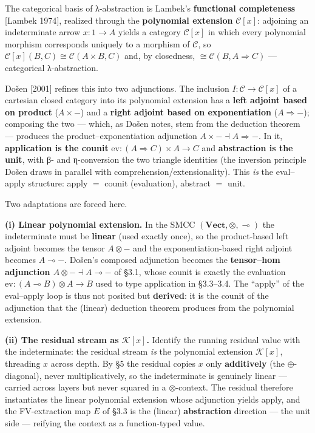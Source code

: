\documentclass[a4paper,11pt]{article}
\begin{document}
The categorical basis of λ-abstraction is Lambek's \textbf{functional
completeness} {[}Lambek 1974{]}, realized through the \textbf{polynomial
extension} \(\mathcal{C}[x]\): adjoining an indeterminate arrow
\(x:1\to A\) yields a category \(\mathcal{C}[x]\) in which every
polynomial morphism corresponds uniquely to a morphism of
\(\mathcal{C}\), so \(\mathcal{C}[x](B,C)\cong\mathcal{C}(A\times B,C)\)
and, by closedness, \(\cong\mathcal{C}(B,A\Rightarrow C)\) ---
categorical λ-abstraction.

Došen {[}2001{]} refines this into two adjunctions. The inclusion
\(I:\mathcal{C}\to\mathcal{C}[x]\) of a cartesian closed category into
its polynomial extension has a \textbf{left adjoint based on product}
(\(A\times-\)) and a \textbf{right adjoint based on exponentiation}
(\(A\Rightarrow-\)); composing the two --- which, as Došen notes, stem
from the deduction theorem --- produces the product--exponentiation
adjunction \(A\times-\dashv A\Rightarrow-\). In it, \textbf{application
is the counit} \(\mathrm{ev}:(A\Rightarrow C)\times A\to C\) and
\textbf{abstraction is the unit}, with β- and η-conversion the two
triangle identities (the inversion principle Došen draws in parallel
with comprehension/extensionality). This \emph{is} the eval--apply
structure: apply \(=\) counit (evaluation), abstract \(=\) unit.

Two adaptations are forced here.

\textbf{(i) Linear polynomial extension.} In the SMCC
\((\mathbf{Vect},\otimes,\multimap)\) the indeterminate must be
\textbf{linear} (used exactly once), so the product-based left adjoint
becomes the tensor \(A\otimes-\) and the exponentiation-based right
adjoint becomes \(A\multimap-\). Došen's composed adjunction becomes the
\textbf{tensor--hom adjunction \(A\otimes-\dashv A\multimap-\)} of §3.1,
whose counit is exactly the evaluation
\(\mathrm{ev}:(A\multimap B)\otimes A\to B\) used to type application in
§3.3--3.4. The ``apply'' of the eval--apply loop is thus not posited but
\textbf{derived}: it is the counit of the adjunction that the (linear)
deduction theorem produces from the polynomial extension.

\textbf{(ii) The residual stream as \(\mathcal{K}[x]\).} Identify the
running residual value with the indeterminate: the residual stream
\emph{is} the polynomial extension \(\mathcal{K}[x]\), threading \(x\)
across depth. By §5 the residual copies \(x\) only \textbf{additively}
(the \(\oplus\)-diagonal), never multiplicatively, so the indeterminate
is genuinely linear --- carried across layers but never squared in a
\(\otimes\)-context. The residual therefore instantiates the linear
polynomial extension whose adjunction yields apply, and the
FV-extraction map \(E\) of §3.3 is the (linear) \textbf{abstraction}
direction --- the unit side --- reifying the context as a function-typed
value.
\end{document}
